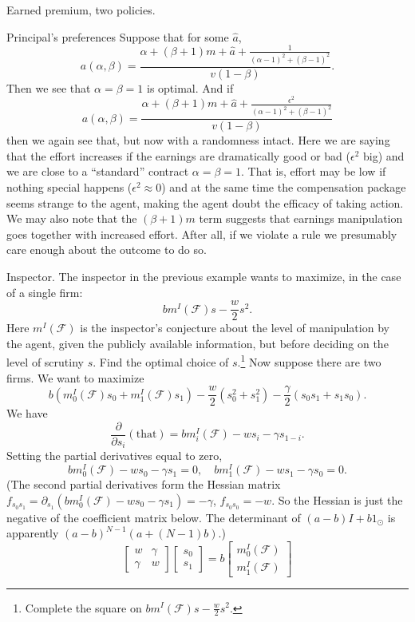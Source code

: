 \begin{example}{Earned premium, two policies.}
\begin{example}{Principal's preferences}
		Suppose that for some $\hat a$,
		\[
			a(\alpha,\beta)=\frac{\alpha+(\beta+1)m+\hat a+\frac1{(\alpha-1)^2+(\beta-1)^2}}{v(1-\beta)}.
		\]
		Then we see that $\alpha=\beta=1$ is optimal.
		And if
		\[
			a(\alpha,\beta)=\frac{\alpha+(\beta+1)m+\hat a+\frac{\epsilon^2}{(\alpha-1)^2+(\beta-1)^2}}{v(1-\beta)}
		\]
		then we again see that, but now with a randomness intact. Here we are saying that the effort increases if the earnings are dramatically good or bad ($\epsilon^2$ big)
		and we are close to a ``standard'' contract $\alpha=\beta=1$. That is, effort may be low if nothing special happens ($\epsilon^2\approx 0$) and at the same time the compensation package seems strange to the agent, making the agent doubt the efficacy of taking action.
		We may also note that the $(\beta+1)m$ term suggests that earnings manipulation goes together with increased effort. After all, if we violate a rule we presumably care enough about the outcome to do so.
	\end{example}
	\begin{example}{Inspector.}
		The inspector in the previous example wants to maximize, in the case of a single firm:
		\[
			bm^I(\mathscr F)s-\frac{w}2s^2.
		\]
		Here $m^I(\mathscr F)$ is the inspector's conjecture about the level of manipulation by the agent, given the publicly available information, but before deciding on the level of scrutiny $s$.
		Find the optimal choice of $s$.\footnote{Complete the square on $bm^I(\mathscr F)s-\frac{w}2s^2$.}
		Now suppose there are two firms. We want to maximize
		\[
			b(m^I_0(\mathscr F)s_0+m^I_1(\mathscr F)s_1)-\frac{w}2(s_0^2+s_1^2)-\frac{\gamma}{2}(s_0s_1+s_1s_0).
		\]
		We have
		\[
			\frac{\partial}{\partial s_i}(\text{that}) = bm^I_i(\mathscr F)-ws_i-\gamma s_{1-i}.
		\]
		Setting the partial derivatives equal to zero,
		\[
			bm^I_0(\mathscr F)-ws_0-\gamma s_{1}=0,\quad bm^I_1(\mathscr F)-ws_1-\gamma s_{0}=0.
		\]
		(The second partial derivatives form the Hessian matrix $f_{s_0s_1}=\partial_{s_1}(bm^I_0(\mathscr F)-ws_0-\gamma s_{1})=-\gamma$,
		$f_{s_0s_0}=-w$. So the Hessian is just the negative of the coefficient matrix below. The determinant of $(a-b)I+b1_{\odot}$ is apparently $(a-b)^{N-1}(a+(N-1)b)$.)
		\[
			\begin{bmatrix} w & \gamma\\ \gamma & w\end{bmatrix}\begin{bmatrix}s_0\\ s_1\end{bmatrix} = b \begin{bmatrix}m^I_0(\mathscr F)\\ m^I_1(\mathscr F)\end{bmatrix}
\]
\end{example}
\end{example}
